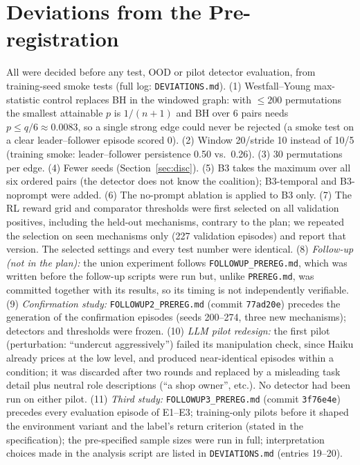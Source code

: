\documentclass[11pt]{article}
\begin{document}
\section{Deviations from the Pre-registration}\label{app:dev}
All were decided before any test, OOD or pilot detector evaluation, from training-seed smoke tests (full log: \texttt{DEVIATIONS.md}). (1) Westfall--Young max-statistic control replaces BH in the windowed graph: with $\le 200$ permutations the smallest attainable $p$ is $1/(n{+}1)$ and BH over 6 pairs needs $p\le q/6\approx0.0083$, so a single strong edge could never be rejected (a smoke test on a clear leader--follower episode scored 0). (2) Window 20/stride 10 instead of 10/5 (training smoke: leader--follower persistence 0.50 vs.\ 0.26). (3) 30 permutations per edge. (4) Fewer seeds (Section~\ref{sec:disc}). (5) B3 takes the maximum over all six ordered pairs (the detector does not know the coalition); B3-temporal and B3-noprompt were added. (6) The no-prompt ablation is applied to B3 only. (7) The RL reward grid and comparator thresholds were first selected on all validation positives, including the held-out mechanisms, contrary to the plan; we repeated the selection on seen mechanisms only (227 validation episodes) and report that version. The selected settings and every test number were identical. (8) \emph{Follow-up (not in the plan):} the union experiment follows \texttt{FOLLOWUP\_PREREG.md}, which was written before the follow-up scripts were run but, unlike \texttt{PREREG.md}, was committed together with its results, so its timing is not independently verifiable. (9) \emph{Confirmation study:} \texttt{FOLLOWUP2\_PREREG.md} (commit \texttt{77ad20e}) precedes the generation of the confirmation episodes (seeds 200--274, three new mechanisms); detectors and thresholds were frozen. (10) \emph{LLM pilot redesign:} the first pilot (perturbation: ``undercut aggressively'') failed its manipulation check, since Haiku already prices at the low level, and produced near-identical episodes within a condition; it was discarded after two rounds and replaced by a misleading task detail plus neutral role descriptions (``a shop owner'', etc.). No detector had been run on either pilot. (11) \emph{Third study:} \texttt{FOLLOWUP3\_PREREG.md} (commit \texttt{3f76e4e}) precedes every evaluation episode of E1--E3; training-only pilots before it shaped the environment variant and the label's return criterion (stated in the specification); the pre-specified sample sizes were run in full; interpretation choices made in the analysis script are listed in \texttt{DEVIATIONS.md} (entries 19--20).
\end{document}
